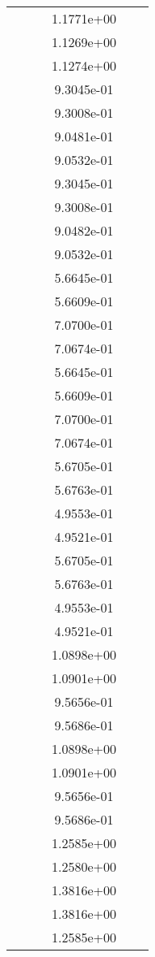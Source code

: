 \begin{xltabular}{\textwidth}{r|rS[table-format=1.3e+2]S[table-format=1.4e+2]S[table-format=1.4e+2]S[table-format=-1.5]}
&  &  & 1.1771e+00 & & \\
&  &  & 1.1269e+00 & & \\
&  &  & 1.1274e+00 & & \\
&  &  & 9.3045e-01 & & \\
&  &  & 9.3008e-01 & & \\
&  &  & 9.0481e-01 & & \\
&  &  & 9.0532e-01 & & \\
&  &  & 9.3045e-01 & & \\
&  &  & 9.3008e-01 & & \\
&  &  & 9.0482e-01 & & \\
&  &  & 9.0532e-01 & & \\
&  &  & 5.6645e-01 & & \\
&  &  & 5.6609e-01 & & \\
&  &  & 7.0700e-01 & & \\
&  &  & 7.0674e-01 & & \\
&  &  & 5.6645e-01 & & \\
&  &  & 5.6609e-01 & & \\
&  &  & 7.0700e-01 & & \\
&  &  & 7.0674e-01 & & \\
&  &  & 5.6705e-01 & & \\
&  &  & 5.6763e-01 & & \\
&  &  & 4.9553e-01 & & \\
&  &  & 4.9521e-01 & & \\
&  &  & 5.6705e-01 & & \\
&  &  & 5.6763e-01 & & \\
&  &  & 4.9553e-01 & & \\
&  &  & 4.9521e-01 & & \\
&  &  & 1.0898e+00 & & \\
&  &  & 1.0901e+00 & & \\
&  &  & 9.5656e-01 & & \\
&  &  & 9.5686e-01 & & \\
&  &  & 1.0898e+00 & & \\
&  &  & 1.0901e+00 & & \\
&  &  & 9.5656e-01 & & \\
&  &  & 9.5686e-01 & & \\
&  &  & 1.2585e+00 & & \\
&  &  & 1.2580e+00 & & \\
&  &  & 1.3816e+00 & & \\
&  &  & 1.3816e+00 & & \\
&  &  & 1.2585e+00 & & \\

\end{xltabular}
